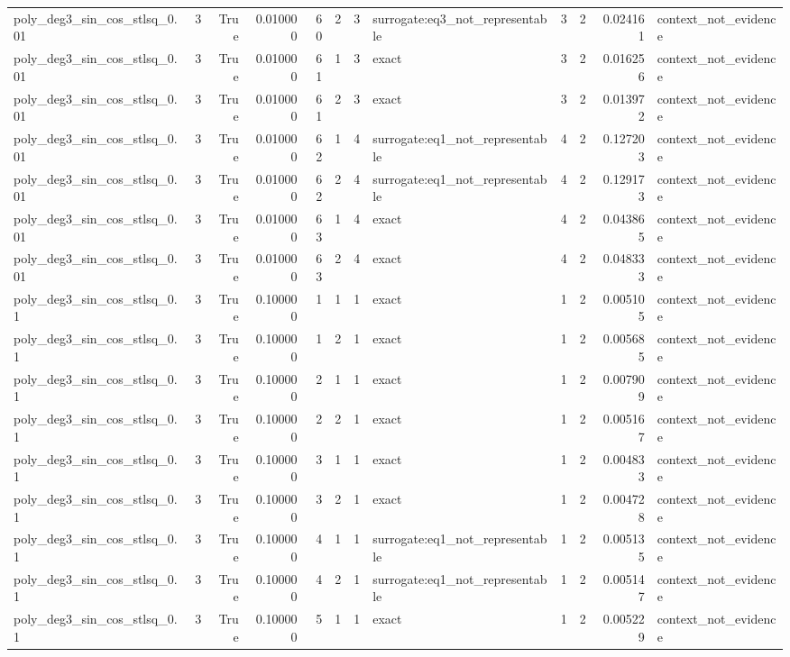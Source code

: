 \begin{tabular}{lrrrrrrlrrrl}
poly\_deg3\_sin\_cos\_stlsq\_0.01 & 3 & True & 0.010000 & 60 & 2 & 3 & surrogate:eq3\_not\_representable & 3 & 2 & 0.024161 & context\_not\_evidence \\
poly\_deg3\_sin\_cos\_stlsq\_0.01 & 3 & True & 0.010000 & 61 & 1 & 3 & exact & 3 & 2 & 0.016256 & context\_not\_evidence \\
poly\_deg3\_sin\_cos\_stlsq\_0.01 & 3 & True & 0.010000 & 61 & 2 & 3 & exact & 3 & 2 & 0.013972 & context\_not\_evidence \\
poly\_deg3\_sin\_cos\_stlsq\_0.01 & 3 & True & 0.010000 & 62 & 1 & 4 & surrogate:eq1\_not\_representable & 4 & 2 & 0.127203 & context\_not\_evidence \\
poly\_deg3\_sin\_cos\_stlsq\_0.01 & 3 & True & 0.010000 & 62 & 2 & 4 & surrogate:eq1\_not\_representable & 4 & 2 & 0.129173 & context\_not\_evidence \\
poly\_deg3\_sin\_cos\_stlsq\_0.01 & 3 & True & 0.010000 & 63 & 1 & 4 & exact & 4 & 2 & 0.043865 & context\_not\_evidence \\
poly\_deg3\_sin\_cos\_stlsq\_0.01 & 3 & True & 0.010000 & 63 & 2 & 4 & exact & 4 & 2 & 0.048333 & context\_not\_evidence \\
poly\_deg3\_sin\_cos\_stlsq\_0.1 & 3 & True & 0.100000 & 1 & 1 & 1 & exact & 1 & 2 & 0.005105 & context\_not\_evidence \\
poly\_deg3\_sin\_cos\_stlsq\_0.1 & 3 & True & 0.100000 & 1 & 2 & 1 & exact & 1 & 2 & 0.005685 & context\_not\_evidence \\
poly\_deg3\_sin\_cos\_stlsq\_0.1 & 3 & True & 0.100000 & 2 & 1 & 1 & exact & 1 & 2 & 0.007909 & context\_not\_evidence \\
poly\_deg3\_sin\_cos\_stlsq\_0.1 & 3 & True & 0.100000 & 2 & 2 & 1 & exact & 1 & 2 & 0.005167 & context\_not\_evidence \\
poly\_deg3\_sin\_cos\_stlsq\_0.1 & 3 & True & 0.100000 & 3 & 1 & 1 & exact & 1 & 2 & 0.004833 & context\_not\_evidence \\
poly\_deg3\_sin\_cos\_stlsq\_0.1 & 3 & True & 0.100000 & 3 & 2 & 1 & exact & 1 & 2 & 0.004728 & context\_not\_evidence \\
poly\_deg3\_sin\_cos\_stlsq\_0.1 & 3 & True & 0.100000 & 4 & 1 & 1 & surrogate:eq1\_not\_representable & 1 & 2 & 0.005135 & context\_not\_evidence \\
poly\_deg3\_sin\_cos\_stlsq\_0.1 & 3 & True & 0.100000 & 4 & 2 & 1 & surrogate:eq1\_not\_representable & 1 & 2 & 0.005147 & context\_not\_evidence \\
poly\_deg3\_sin\_cos\_stlsq\_0.1 & 3 & True & 0.100000 & 5 & 1 & 1 & exact & 1 & 2 & 0.005229 & context\_not\_evidence \\

\end{tabular}
